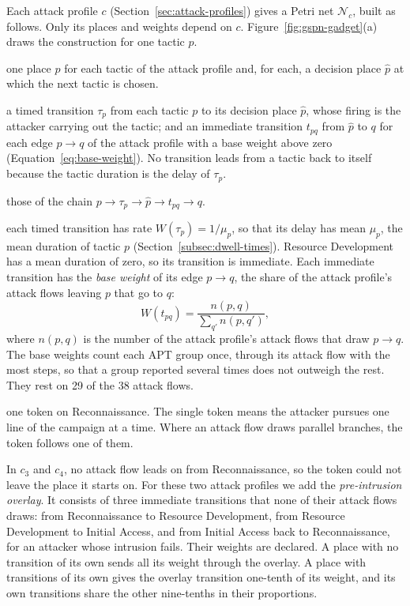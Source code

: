 \documentclass{cshonours}
\begin{document}
Each attack profile $c$ (Section~\ref{sec:attack-profiles}) gives a Petri
net $\mathcal{N}_c$, built as follows. Only its places and weights depend on
$c$. Figure~\ref{fig:gspn-gadget}(a) draws the construction for one tactic
$p$.
\begin{description}[nosep, leftmargin=1em]
  \item[Places $P$:] one place $p$ for each tactic of the attack profile and,
  for each, a decision place $\hat{p}$ at which the next tactic is chosen.
  \item[Transitions $T$:] a timed transition $\tau_p$ from each tactic $p$
  to its decision place $\hat{p}$, whose firing is the attacker carrying out
  the tactic; and an immediate transition $t_{pq}$ from $\hat{p}$ to $q$ for
  each edge $p \to q$ of the attack profile with a base weight above zero
  (Equation~\ref{eq:base-weight}). No transition leads from a tactic back to
  itself because the tactic duration is the delay of $\tau_p$.
  \item[Arcs $I$, $O$:] those of the chain
  $p \to \tau_p \to \hat{p} \to t_{pq} \to q$.
  \item[Weights $W$:] each timed transition has rate
  $W(\tau_p) = 1/\mu_p$, so that its delay has mean $\mu_p$, the mean duration
  of tactic $p$ (Section~\ref{subsec:dwell-times}). Resource Development has
  a mean duration of zero, so its transition is immediate. Each immediate
  transition has the \emph{base weight} of its edge $p \to q$, the share of
  the attack profile's attack flows leaving $p$ that go to $q$:
  \begin{equation}
    W(t_{pq}) = \frac{n(p, q)}{\sum_{q'} n(p, q')},
    \label{eq:base-weight}
  \end{equation}
  where $n(p, q)$ is the number of the attack profile's attack flows that
  draw $p \to q$. The base weights count each APT group once, through its
  attack flow with the most steps, so that a group reported several times
  does not outweigh the rest. They rest on 29 of the 38 attack flows.
  \item[Initial marking $M_0$:] one token on Reconnaissance. The single token
  means the attacker pursues one line of the campaign at a time. Where an
  attack flow draws parallel branches, the token follows one of them.
\end{description}

In $c_3$ and $c_4$, no attack flow leads on from Reconnaissance, so the token
could not leave the place it starts on. For these two attack profiles we add
the \emph{pre-intrusion overlay}. It consists of three immediate transitions
that none of their attack flows draws: from Reconnaissance to Resource Development, from
Resource Development to Initial Access, and from Initial Access back to
Reconnaissance, for an attacker whose intrusion fails. Their weights are
declared. A place with no transition of its own sends all its weight through
the overlay. A place with transitions of its own gives the overlay transition
one-tenth of its weight, and its own transitions share the other nine-tenths
in their proportions.
\end{document}
